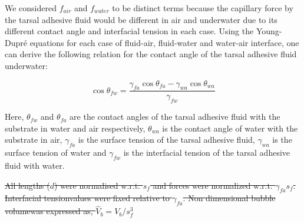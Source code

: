 \documentclass[vruler,JEB]{COB}%
\providecommand{\DIFdel}[1]{{\protect\color{red}\sout{#1}}}                      %
\providecommand{\DIFdelFL}[1]{\DIFdel{#1}} %
\providecommand{\DIFdelbeginFL}{} %
\providecommand{\DIFdelendFL}{} %
\begin{document}
We considered $f_{air}$ and $f_{water}$ to be distinct terms
because the capillary force by the tarsal adhesive fluid would be different
in air and underwater due to its different contact angle and interfacial
tension in each case. Using the Young-Dupr\'{e} equations
for each case of fluid-air, fluid-water and water-air interface, one
can derive the following relation for the contact angle of the tarsal adhesive
fluid underwater:

\begin{equation}
\cos\theta_{fw}=\frac{\gamma_{fa}\cos\theta_{fa}-\gamma_{wa}\cos\theta_{wa}}{\gamma_{fw}}\label{eq:theta_fw}
\end{equation}

Here, $\theta_{fw}$ and $\theta_{fa}$ are the contact angles of
the tarsal adhesive fluid with the substrate in water and air respectively,
$\theta_{wa}$ is the contact angle of water with the substrate in
air, $\gamma_{fa}$ is the surface tension of the tarsal adhesive fluid,
$\gamma_{wa}$ is the surface tension of water and $\gamma_{fw}$
is the interfacial tension of the tarsal adhesive fluid with water.

\DIFdelbeginFL \DIFdelFL{All lengths ($d$) were normalised w.r.t. $s_{f}$ and forces were normalized
w.r.t. $\gamma_{fa}s_{f}$. Interfacial tensionvalues were fixed relative
to $\gamma_{fa}$. Non dimensional bubble volumewas expressed as, $\hat{V}_{b}=V_{b}/s_{f}^{3}$
}\DIFdelendFL 
\end{document}
